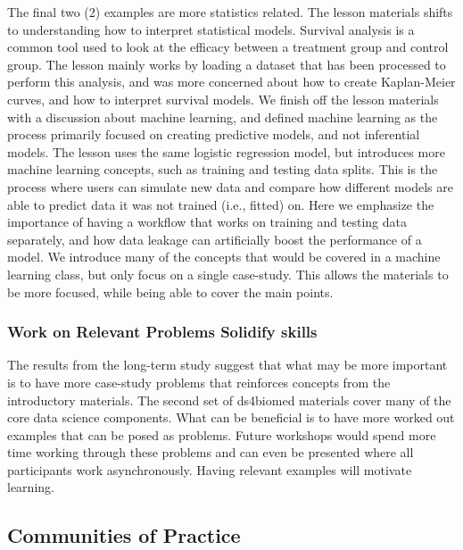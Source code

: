 \documentclass[030-workshop.tex]{subfiles}
\begin{document}
        The final two (2) examples are more statistics related.
        The lesson materials shifts to understanding how to interpret statistical models.
        Survival analysis is a common tool used to look at the efficacy between a treatment group and control group.
        The lesson mainly works by loading a dataset that has been processed to perform this analysis,
        and was more concerned about how to create Kaplan-Meier curves, and how to interpret survival models.
        We finish off the lesson materials with a discussion about machine learning,
        and defined machine learning as the process primarily focused on creating predictive models,
        and not inferential models.
        The lesson uses the same logistic regression model,
        but introduces more machine learning concepts, such as training and testing data splits.
        This is the process where users can simulate new data and compare how different models are able to predict data it was not trained (i.e., fitted) on.
        Here we emphasize the importance of having a workflow that works on training and testing data separately,
        and how data leakage can artificially boost the performance of a model.
        We introduce many of the concepts that would be covered in a machine learning class,
        but only focus on a single case-study.
        This allows the materials to be more focused,
        while being able to cover the main points.

    \subsubsection{Work on Relevant Problems Solidify skills}

        The results from the long-term study suggest that what may be more important is to have
        more case-study problems that reinforces concepts from the introductory materials.
        The second set of ds4biomed materials cover many of the core data science components.
        What can be beneficial is to have more worked out examples that can be posed as problems.
        Future workshops would spend more time working through these problems and can even be presented
        where all participants work asynchronously.
        Having relevant examples will motivate learning.


    \subsection{Communities of Practice}
\end{document}
